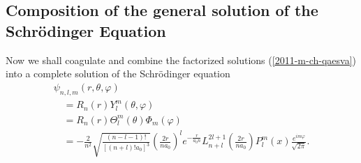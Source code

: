 \subsection{Composition of the general solution of the Schr\"odinger Equation}

Now we shall coagulate
and combine the factorized solutions (\ref{2011-m-ch-qaesva})
into a complete solution of the Schr\"odinger equation
\begin{equation}
\begin{array}{l}
\psi_{n,l,m} (r, \theta ,\varphi ) \\
\quad = R_n(r)Y_l^m ( \theta ,\varphi )\\
\quad = R_n(r)\Theta_l^m(\theta)\Phi_m(\varphi)  \\
\quad = -\frac{2}{n^2}\sqrt{\frac{(n-l-1)!}{[(n+l)!a_0]^3}}
\left( \frac{2 {r}}{n a_0 }\right)^l e^{-\frac{r}{a_0 n}}
L^{2l+1}_{n+l} \left( \frac{2 {r}}{n a_0 }\right)
 P_l^m(x)
\frac{e^{im\varphi}} {\sqrt{2\pi }  } .
\end{array}
\label{2011-m-ch-qaesva}
\end{equation}
